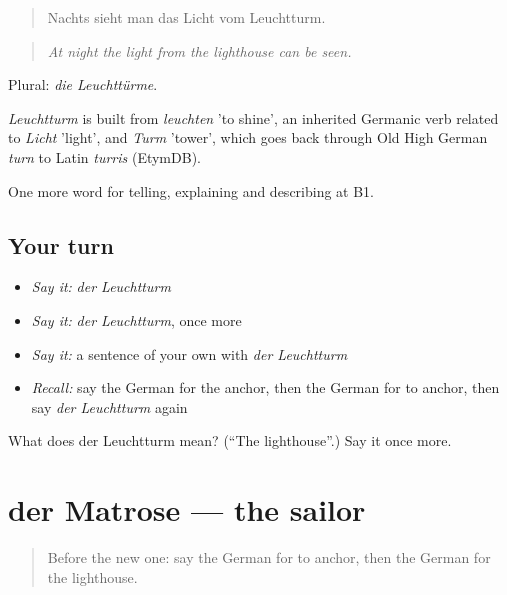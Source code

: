 \begin{quote}
Nachts sieht man das Licht vom Leuchtturm.
\end{quote}

\begin{quote}
\emph{At night the light from the lighthouse can be seen.}
\end{quote}

Plural: \emph{die Leuchttürme}.

\begin{cousinweb}
\emph{Leuchtturm} is built from \emph{leuchten} 'to shine', an inherited Germanic verb related to \emph{Licht} 'light', and \emph{Turm} 'tower', which goes back through Old High German \emph{turn} to Latin \emph{turris} (EtymDB).
\end{cousinweb}

\begin{grammarlens}[title={What you've built}]
One more word for telling, explaining and describing at B1.
\end{grammarlens}

\subsection*{Your turn}
\begin{itemize}
\raggedright
  \item \emph{Say it:} \emph{der Leuchtturm}
  \item \emph{Say it:} \emph{der Leuchtturm}, once more
  \item \emph{Say it:} a sentence of your own with \emph{der Leuchtturm}
  \item \emph{Recall:} say the German for the anchor, then the German for to anchor, then say \emph{der Leuchtturm} again
\end{itemize}

\begin{tcolorbox}[breakable,colback=teal!4,colframe=teal!35!black,title={Before you move on}]
What does der Leuchtturm mean? (\textquotedblleft{}The lighthouse\textquotedblright{}.) Say it once more.
\end{tcolorbox}
\section[der Matrose]{der Matrose — the sailor}

\label{lesson:GE-C423-matrose}



\begin{quote}
Before the new one: say the German for to anchor, then the German for the lighthouse.
\end{quote}


